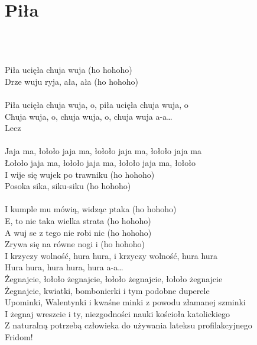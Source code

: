 \documentclass[a5paper, 10pt]{book}
\begin{document}
\section{Piła}\textcolor{lightgray}{\textit{}}\\~\\
\begin{minipage}[t]{0.85\textwidth}
Piła ucięła chuja wuja (ho hohoho)\\
Drze wuju ryja, ała, ała (ho hohoho)\\
\\
\hspace*{3mm}Piła ucięła chuja wuja, o, piła ucięła chuja wuja, o\\
\hspace*{3mm}Chuja wuja, o, chuja wuja, o, chuja wuja a-a…\\
\hspace*{3mm}Lecz\\
\\
\hspace*{6mm}Jaja ma, łołoło jaja ma, łołoło jaja ma, łołoło jaja ma\\
\hspace*{6mm}Łołoło jaja ma, łołoło jaja ma, łołoło jaja ma, łołoło\\

I wije się wujek po trawniku (ho hohoho)\\
Posoka sika, siku-siku (ho hohoho)\\
\\
I kumple mu mówią, widząc ptaka (ho hohoho)\\
E, to nie taka wielka strata (ho hohoho)\\

A wuj se z tego nie robi nic (ho hohoho)\\
Zrywa się na równe nogi i (ho hohoho)\\

\hspace*{3mm}I krzyczy wolność, hura hura, i krzyczy wolność, hura hura\\
\hspace*{3mm}Hura hura, hura hura, hura a-a…\\

\hspace*{6mm}Żegnajcie, łołoło żegnajcie, łołoło żegnajcie, łołoło żegnajcie \\
\hspace*{6mm}Żegnajcie, kwiatki, bombonierki i tym podobne duperele\\
\hspace*{6mm}Upominki, Walentynki i kwaśne minki z powodu złamanej szminki\\
\hspace*{6mm}I żegnaj wreszcie i ty, niezgodności nauki kościoła katolickiego\\
\hspace*{6mm}Z naturalną potrzebą człowieka do używania lateksu profilakcyjnego\\
\hspace*{6mm}Fridom!\\
\end{minipage}
\end{document}

